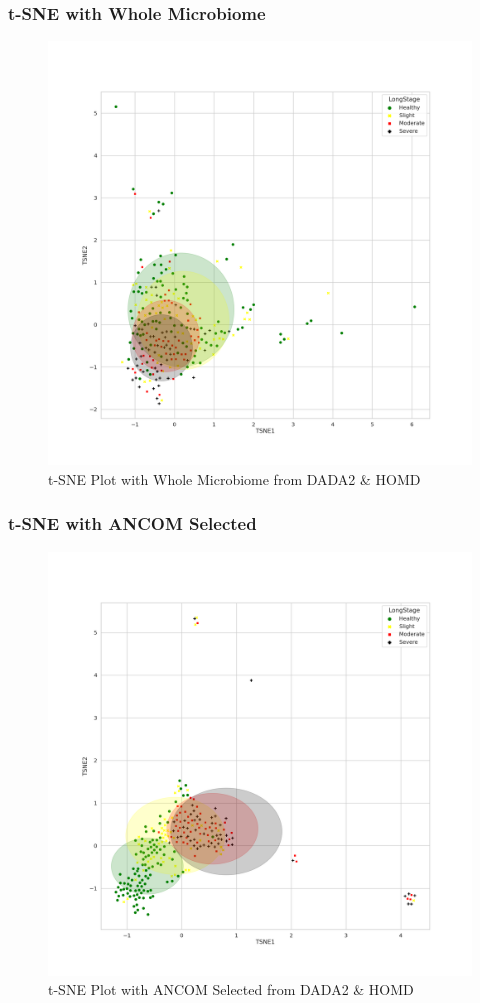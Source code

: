 \documentclass{beamer}
\begin{document}
    \begin{frame}
        \frametitle{t-SNE with Whole Microbiome}

        \begin{figure}
            \includegraphics[width=0.5 \linewidth]{figures/tSNE/Whole/whole.DADA2.homd.png}
            \caption{t-SNE Plot with Whole Microbiome from DADA2 \& HOMD}
        \end{figure}
    \end{frame}

    \begin{frame}
        \frametitle{t-SNE with ANCOM Selected}

        \begin{figure}
            \includegraphics[width=0.5 \linewidth]{figures/tSNE/ANCOM/ANCOM.DADA2.homd.png}
            \caption{t-SNE Plot with ANCOM Selected from DADA2 \& HOMD}
        \end{figure}
    \end{frame}
\end{document}
